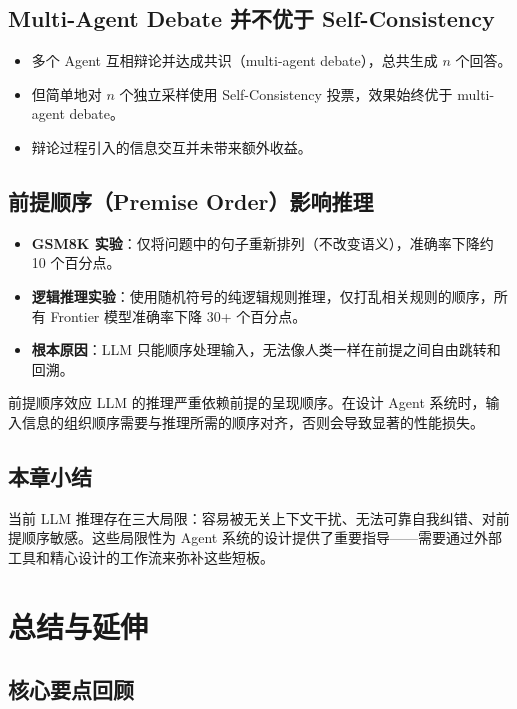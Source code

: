 \documentclass[a4paper]{article}
\begin{document}
\subsection{Multi-Agent Debate 并不优于 Self-Consistency}

\begin{itemize}
    \item 多个 Agent 互相辩论并达成共识（multi-agent debate），总共生成 $n$ 个回答。
    \item 但简单地对 $n$ 个独立采样使用 Self-Consistency 投票，效果始终优于 multi-agent debate。
    \item 辩论过程引入的信息交互并未带来额外收益。
\end{itemize}

\subsection{前提顺序（Premise Order）影响推理}

\begin{itemize}
    \item \textbf{GSM8K 实验}：仅将问题中的句子重新排列（不改变语义），准确率下降约 10 个百分点。
    \item \textbf{逻辑推理实验}：使用随机符号的纯逻辑规则推理，仅打乱相关规则的顺序，所有 Frontier 模型准确率下降 30+ 个百分点。
    \item \textbf{根本原因}：LLM 只能顺序处理输入，无法像人类一样在前提之间自由跳转和回溯。
\end{itemize}

\begin{warningbox}{前提顺序效应}
LLM 的推理严重依赖前提的呈现顺序。在设计 Agent 系统时，输入信息的组织顺序需要与推理所需的顺序对齐，否则会导致显著的性能损失。
\end{warningbox}

\subsection{本章小结}

当前 LLM 推理存在三大局限：容易被无关上下文干扰、无法可靠自我纠错、对前提顺序敏感。这些局限性为 Agent 系统的设计提供了重要指导——需要通过外部工具和精心设计的工作流来弥补这些短板。

\section{总结与延伸}

\subsection{核心要点回顾}
\end{document}
